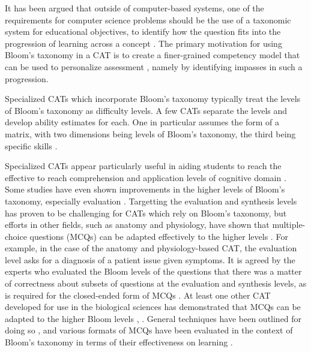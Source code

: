 It has been argued that outside of computer-based systems, one of the
requirements for computer science problems should be the use of a taxonomic
system for educational objectives, to identify how the question fits into the
progression of learning across a concept \cite{loria-saenz2008}.  The primary
motivation for using Bloom's taxonomy in a CAT is to create a finer-grained
competency model that can be used to personalize assessment
\cite{sitthisak2007towards}, namely by identifying impasses in such a
progression. 

Specialized CATs which incorporate Bloom's taxonomy typically treat the levels
of Bloom's taxonomy as difficulty levels. A few CATs separate the levels and
develop ability estimates for each.  One in particular assumes the form of a
matrix, with two dimensions being levels of Bloom's taxonomy, the third being
specific skills \cite{raykova2011adaptive}.

Specialized CATs appear particularly useful in aiding students to reach the
effective to reach comprehension and application levels of cognitive domain
\cite{ccepni2006effects}.  Some studies have even shown improvements in the
higher levels of Bloom's taxonomy, especially evaluation
\cite{hopson2001using}.  Targetting the evaluation and synthesis levels has
proven to be challenging for CATs which rely on Bloom's taxonomy, but efforts
in other fields, such as anatomy and physiology, have shown that
multiple-choice questions (MCQs) can be adapted effectively to the higher
levels \cite{de2011computer}.  For example, in the case of the anatomy and
physiology-based CAT, the evaluation level asks for a diagnosis of a patient
issue given symptoms.  It is agreed by the experts who evaluated the Bloom
levels of the questions that there was a matter of correctness about subsets of
questions at the evaluation and synthesis levels, as is required for the
closed-ended form of MCQs \cite{lemons2013questions}.  At least one other CAT
developed for use in the biological sciences has demonstrated that MCQs can be
adapted to the higher Bloom levels \cite{hernan2008testing},
\cite{lemons2013questions}.  General techniques have been outlined for doing so
\cite{duke2001using}, and various formats of MCQs have been evaluated in the
context of Bloom's taxonomy in terms of their effectiveness on learning
\cite{haladyna1992effectiveness}.

